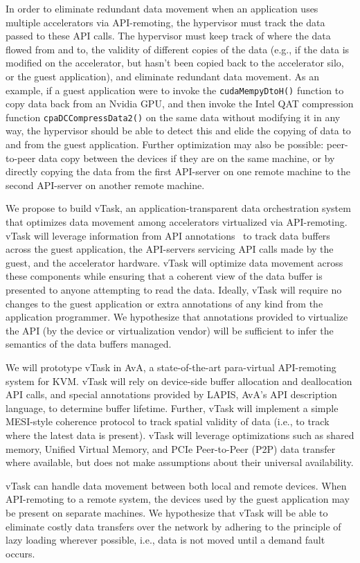 In order to eliminate redundant data movement when an application uses multiple accelerators via API-remoting, the hypervisor must track the data passed to these API calls. The hypervisor must keep track of where the data flowed from and to, the validity of different copies of the data (e.g., if the data is modified on the accelerator, but hasn’t been copied back to the accelerator silo, or the guest application), and eliminate redundant data movement. As an example, if a guest application were to invoke the \texttt{cudaMempyDtoH()} function to copy data back from an Nvidia GPU, and then invoke the Intel QAT compression function \texttt{cpaDCCompressData2()} on the same data without modifying it in any way, the hypervisor should be able to detect this and elide the copying of data to and from the guest application. Further optimization may also be possible: peer-to-peer data copy between the devices if they are on the same machine, or by directly copying the data from the first API-server on one remote machine to the second API-server on another remote machine.

We propose to build vTask, an application-transparent data orchestration system that optimizes data movement among accelerators virtualized via API-remoting. vTask will leverage information from API annotations~\cite{ava-hotos} to track data buffers across the guest application, the API-servers servicing API calls made by the guest, and the accelerator hardware. vTask will optimize data movement across these components while ensuring that a coherent view of the data buffer is presented to anyone attempting to read the data. Ideally, vTask will require no changes to the guest application or  extra annotations of any kind from the application programmer. We hypothesize that annotations provided to virtualize the API (by the device or virtualization vendor) will be sufficient to infer the semantics of the data buffers managed.

We will prototype vTask in AvA, a state-of-the-art para-virtual API-remoting system for KVM. vTask will rely on device-side buffer allocation and deallocation API calls, and special annotations provided by LAPIS, AvA’s API description language, to determine buffer lifetime. Further, vTask will implement a simple MESI-style coherence protocol to track spatial validity of data (i.e., to track where the latest data is present). vTask will leverage optimizations such as shared memory, Unified Virtual Memory, and PCIe Peer-to-Peer (P2P) data transfer where available, but does not make assumptions about their universal availability.

vTask can handle data movement between both local and remote devices. When API-remoting to a remote system, the devices used by the guest application may be present on separate machines. We hypothesize that vTask will be able to eliminate costly data transfers over the network by adhering to the principle of lazy loading wherever possible, i.e., data is not moved until a demand fault occurs.

